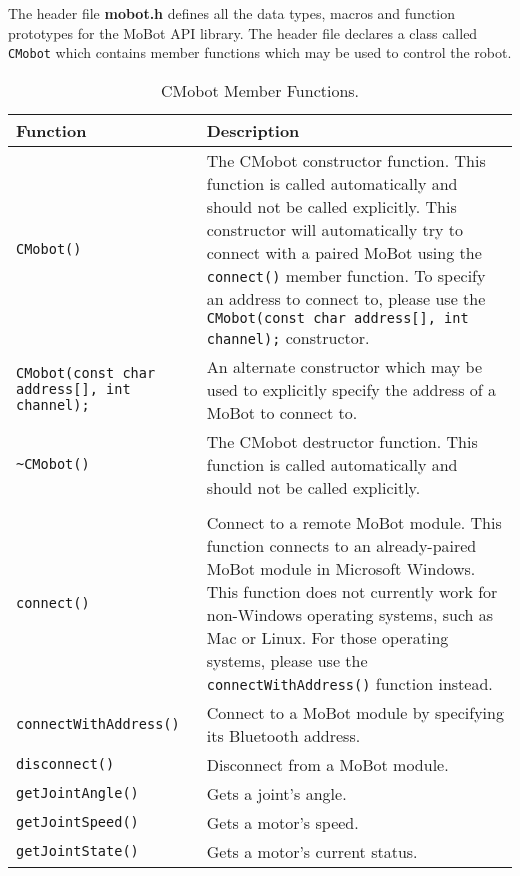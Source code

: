 \noindent
The header file {\bf mobot.h} defines all the data types, macros 
and function prototypes for the MoBot API library. The header file
declares a class called \texttt{CMobot} which contains member functions which
may be used to control the robot.

\begin{table}[!hp]
\begin{center}
\caption{CMobot Member Functions.}
\begin{tabular}{p{38 mm}p{77 mm}}
\hline
Function & Description \\
\hline
\texttt{CMobot()} & The CMobot constructor function. This function
is called automatically and should not be called explicitly. This constructor will 
automatically try to connect with a paired MoBot using the \texttt{connect()} member
function. To specify an address to connect to, please use the
\texttt{CMobot(const char address[], int channel);} constructor.\\
\texttt{CMobot(const char address[], int channel);} & 
An alternate constructor which may be used to explicitly specify the address of a MoBot 
to connect to. \\
\texttt{\textasciitilde CMobot()} & The CMobot destructor function. This function
is called automatically and should not be called explicitly. \\
& \\
\texttt{connect()} & Connect to a remote MoBot module. This function connects to an already-paired MoBot module in Microsoft Windows. This function does not currently work for non-Windows operating systems, such as Mac or Linux. For those operating systems, please use the \texttt{connectWithAddress()} function instead. \\
\texttt{connectWithAddress()} & Connect to a MoBot module by specifying its Bluetooth address. \\
\texttt{disconnect()} & Disconnect from a MoBot module. \\
\texttt{getJointAngle()} & Gets a joint's angle. \\
\texttt{getJointSpeed()} & Gets a motor's speed. \\
\texttt{getJointState()} & Gets a motor's current status. \\

\end{tabular}
\end{center}
\end{table}
